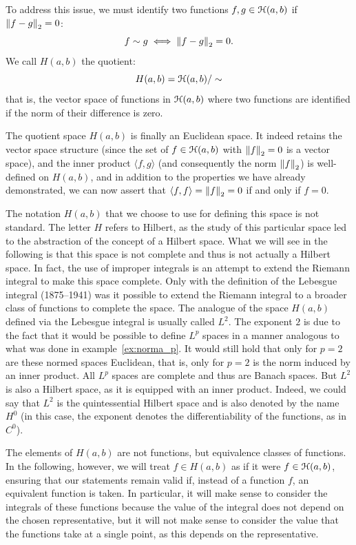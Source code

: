 To address this issue, we must identify two functions $f,g\in \mathcal H(a,b)$ if
${\left\Vert f-g\right\Vert}_2=0$:
\[
  f \sim g  \iff {\left\Vert f-g\right\Vert}_2=0.
\]
We call $H(a,b)$ the quotient:
\[
  H(a,b) = \mathcal H(a,b)/\sim
\]
that is, the vector space of functions in $\mathcal H(a,b)$ where two functions are
identified if the norm of their difference is zero.

The quotient space $H(a,b)$ is finally an Euclidean space. It indeed retains the
vector space structure (since the set of $f\in \mathcal H(a,b)$ with ${\left\Vert f\right\Vert}_2=0$ is a
vector space), and the inner product $\langle f,g\rangle$ (and consequently the
norm ${\left\Vert f\right\Vert}_2$) is well-defined on $H(a,b)$, and in addition to the properties
we have already demonstrated, we can now assert that $\langle f,f\rangle =
{\left\Vert f\right\Vert}_2=0$ if and only if $f=0$.

\begin{remark}
The notation $H(a,b)$ that we choose to use for defining this space is not
standard. The letter $H$ refers to Hilbert, as the study of this particular
space led to the abstraction of the concept of a Hilbert space. What we will see
in the following is that this space is not complete and thus is not actually a
Hilbert space. In fact, the use of improper integrals is an attempt to extend
the Riemann integral to make this space complete. Only with the definition of
the Lebesgue integral (1875--1941) was it possible to extend the Riemann
integral to a broader class of functions to complete the space. The analogue of
the space $H(a,b)$ defined via the Lebesgue integral is usually called $L^2$.
The exponent $2$ is due to the fact that it would be possible to define $L^p$
spaces in a manner analogous to what was done in example~\ref{ex:norma_p}. It
would still hold that only for $p=2$ are these normed spaces Euclidean, that is,
only for $p=2$ is the norm induced by an inner product. All $L^p$ spaces are
complete and thus are Banach spaces. But $L^2$ is also a Hilbert space, as it is
equipped with an inner product. Indeed, we could say that $L^2$ is the
quintessential Hilbert space and is also denoted by the name $H^0$ (in this
case, the exponent denotes the differentiability of the functions, as in $C^0$).
\end{remark}

The elements of $H(a,b)$ are not functions, but equivalence classes of
functions. In the following, however, we will treat $f\in H(a,b)$ as if it were
$f\in \mathcal H(a,b)$, ensuring that our statements remain valid if, instead of a
function $f$, an equivalent function is taken. In particular, it will make sense
to consider the integrals of these functions because the value of the integral
does not depend on the chosen representative, but it will not make sense to
consider the value that the functions take at a single point, as this depends on
the representative.

